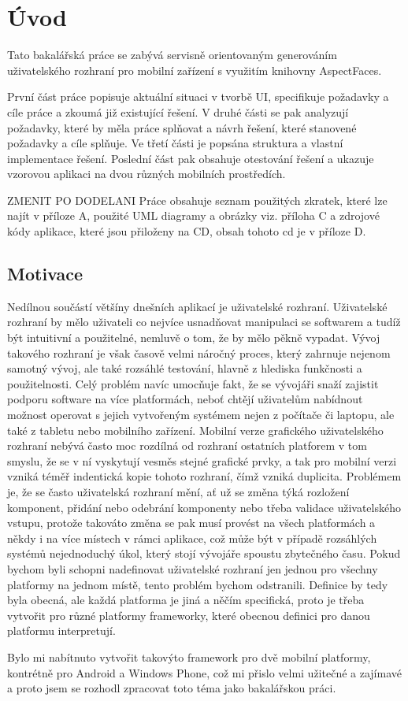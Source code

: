 \chapter{Úvod}
Tato bakalářská práce se zabývá servisně orientovaným generováním uživatelského rozhraní pro mobilní zařízení s využitím knihovny AspectFaces. 

První část práce popisuje aktuální situaci v tvorbě UI, specifikuje požadavky a cíle práce a zkoumá již existující řešení. V druhé části se pak analyzují požadavky, které by měla práce splňovat a návrh řešení, které stanovené požadavky a cíle splňuje. Ve třetí části je popsána struktura a vlastní implementace řešení. Poslední část pak obsahuje otestování řešení a ukazuje vzorovou aplikaci na dvou různých mobilních prostředích.

ZMENIT PO DODELANI
Práce obsahuje seznam použitých zkratek, které lze najít v příloze A, použité UML diagramy a obrázky viz. příloha C a zdrojové kódy
aplikace, které jsou přiloženy na CD, obsah tohoto cd je v příloze D.
 

\section{Motivace}
Nedílnou součástí většíny dnešních aplikací je uživatelské rozhraní. Uživatelské rozhraní by mělo uživateli co nejvíce usnadňovat manipulaci se softwarem a tudíž být intuitivní a použitelné, nemluvě o tom, že by mělo pěkně vypadat. Vývoj takového rozhraní je však časově velmi náročný proces, který zahrnuje nejenom samotný vývoj, ale také rozsáhlé testování, hlavně z hlediska funkčnosti a použitelnosti. Celý problém navíc umocňuje fakt, že se vývojáři snaží zajistit podporu software na více platformách, neboť chtějí uživatelům nabídnout možnost operovat s jejich vytvořeným systémem nejen z počítače či laptopu, ale také z tabletu nebo mobilního zařízení. Mobilní verze grafického uživatelského rozhraní nebývá často moc rozdílná od rozhraní ostatních platforem v tom smyslu, že se v ní vyskytují vesměs stejné grafické prvky, a tak pro mobilní verzi vzniká téměř indentická kopie tohoto rozhraní, čímž vzniká duplicita. Problémem je, že se často uživatelská rozhraní mění, ať už se změna týká rozložení komponent, přidání nebo odebrání komponenty nebo třeba validace uživatelského vstupu, protože takováto změna se pak musí provést na všech platformách a někdy i na více místech v rámci aplikace, což může být v případě rozsáhlých systémů nejednoduchý úkol, který stojí vývojáře spoustu zbytečného času. Pokud bychom byli schopni nadefinovat uživatelské rozhraní jen jednou pro všechny platformy na jednom místě, tento problém bychom odstranili. Definice by tedy byla obecná, ale každá platforma je jiná a něčím specifická, proto je třeba vytvořit pro různé platformy frameworky, které obecnou definici pro danou platformu interpretují. 

Bylo mi nabítnuto vytvořit takovýto framework pro dvě mobilní platformy, kontrétně pro Android a Windows Phone, což mi přislo velmi užitečné a zajímavé a proto jsem se rozhodl zpracovat toto téma jako bakalářskou práci.
